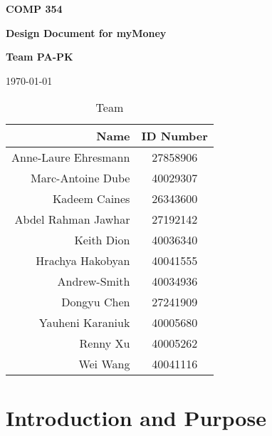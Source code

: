 \documentclass[12pt]{article}
\begin{document}
\vspace*{0.5in}
\centerline{\bf\Large COMP 354}
\centerline{\bf\Large Design Document for myMoney}

\vspace*{0.5in}
\centerline{\bf\Large Team PA-PK}

\vspace*{0.5in}
\centerline{\today}

\vspace*{1.5in}
\begin{table}[htbp]
\caption{Team}
\begin{center}
\begin{tabular}{|r | c|}
\hline
Name & ID Number \\
\hline\hline
Anne-Laure Ehresmann & 27858906 \\
\hline
Marc-Antoine Dube & 40029307 \\
\hline
Kadeem Caines & 26343600 \\
\hline
Abdel Rahman Jawhar & 27192142 \\
\hline
Keith Dion & 40036340 \\
\hline
Hrachya Hakobyan & 40041555 \\
\hline
Andrew-Smith & 40034936 \\
\hline
Dongyu Chen & 27241909 \\
\hline
Yauheni Karaniuk & 40005680 \\
\hline
Renny Xu & 40005262\\
\hline
Wei Wang & 40041116 \\
\hline
\end{tabular}
\end{center}
\end{table}

\clearpage

\tableofcontents
\listoffigures
\listoftables

\clearpage


\section{Introduction and Purpose}
\end{document}
